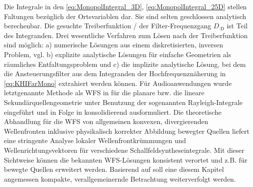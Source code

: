 Die Integrale in den \Glgn\eqref{eq:MonopolIntegral_3D}, \eqref{eq:MonopolIntegral_25D}
stellen Faltungen bezüglich der Ortsvariablen dar.
%
Sie sind selten geschlossen analytisch berechenbar.
%
Die gesuchte Treiberfunktion / der Filter-Frequenzgang $D_{\cdot\text{D}}$
ist Teil des Integranden.
%
Drei wesentliche Verfahren zum Lösen nach der Treiberfunktion sind möglich:
%
a) numerische Lösungen aus einem diskretisierten, inversen
Problem, vgl. \cite{Ise1999,Kolundzija2009a,Bai2015_JASA,Koyama2020_IEEE}
b) explizite analytische Lösungen für einfache Geometrien als räumliches
Entfaltungsproblem \cite{Ahrens2008_Acta,Spors2010a,Ahrens2010_IEEE,Fazi2010,Koyama2013}
und c) die implizite analytische Lösung, bei dem die Ansteuerungsfilter
aus dem Integranden der Hochfrequenznäherung in \Glg\eqref{eq:KHIFarMono}
extrahiert werden können.
%
Für Audioanwendungen wurde letztgenannte Methode als WFS in \cite{Berkhout1993_JASA, Vries1996_JAES}
für die planare bzw. die lineare Sekundärquellengeometrie
unter Benutzung der sogenannten Rayleigh-Integrale \cite[Kap.~25.5]{Skudrzyk1971}
eingeführt und in Folge in
\cite{Start1997_diss,Verheijen1997_diss,Voelk2012,Zotter2013,Firtha2019_diss,ZotterSchultz2020_White}
konsolidierend ausformuliert.
%
Die theoretische Abhandlung \cite{Firtha2019_diss} für die WFS von
allgemeinen konvexen, divergierenden Wellenfronten inklusive physikalisch korrekter
Abbildung bewegter Quellen liefert eine stringente Analyse lokaler
Wellenfrontkrümmungen und Wellenrichtungsvektoren für verschiedene
Schallfeldsyntheseintegrale.
%
Mit dieser Sichtweise können die bekannten WFS-Lösungen konsistent verortet und
z.B. für bewegte Quellen \cite{Franck2007, Ahrens2011} erweitert werden.
%
Basierend auf \cite{ZotterSchultz2020_White} soll
eine diesem Kapitel angemessen kompakte, verallgemeinernde Betrachtung
weiterverfolgt werden.



